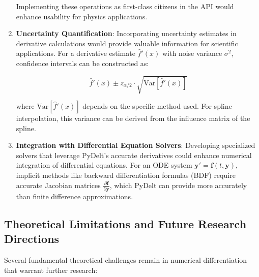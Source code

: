 \documentclass[10pt,journal,compsoc]{IEEEtran}
\begin{document}
\begin{enumerate}
    Implementing these operations as first-class citizens in the API would enhance usability for physics applications.
    
    \item \textbf{Uncertainty Quantification}: Incorporating uncertainty estimates in derivative calculations would provide valuable information for scientific applications. For a derivative estimate $\hat{f}'(x)$ with noise variance $\sigma^2$, confidence intervals can be constructed as:
    
    \begin{equation}
        \hat{f}'(x) \pm z_{\alpha/2} \cdot \sqrt{\text{Var}[\hat{f}'(x)]}
    \end{equation}
    
    where $\text{Var}[\hat{f}'(x)]$ depends on the specific method used. For spline interpolation, this variance can be derived from the influence matrix of the spline.
    
    \item \textbf{Integration with Differential Equation Solvers}: Developing specialized solvers that leverage PyDelt's accurate derivatives could enhance numerical integration of differential equations. For an ODE system $\mathbf{y}' = \mathbf{f}(t, \mathbf{y})$, implicit methods like backward differentiation formulas (BDF) require accurate Jacobian matrices $\frac{\partial \mathbf{f}}{\partial \mathbf{y}}$, which PyDelt can provide more accurately than finite difference approximations.
\end{enumerate}

\subsection{Theoretical Limitations and Future Research Directions}

Several fundamental theoretical challenges remain in numerical differentiation that warrant further research:
\end{document}
